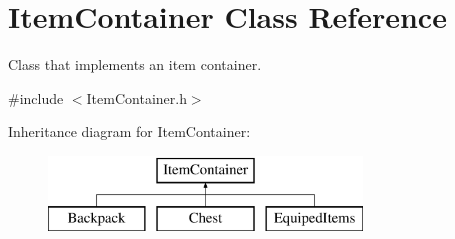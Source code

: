 \hypertarget{class_item_container}{}\section{Item\+Container Class Reference}
\label{class_item_container}


Class that implements an item container.  




{\ttfamily \#include $<$Item\+Container.\+h$>$}

Inheritance diagram for Item\+Container\+:\begin{figure}[H]
\begin{center}
\leavevmode
\includegraphics[height=2.000000cm]{class_item_container}
\end{center}
\end{figure}
